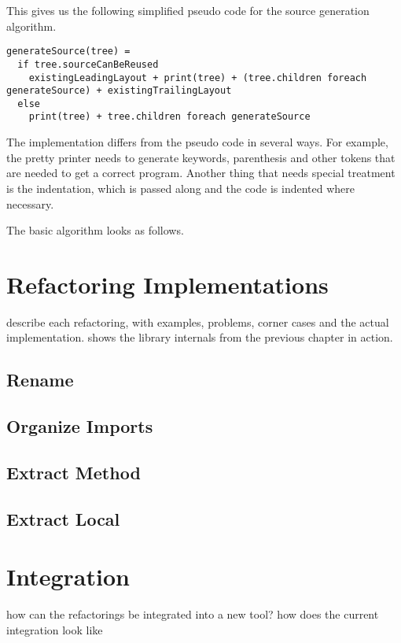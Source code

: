 \documentclass[10pt,a4paper,oneside]{scrreprt}
\begin{document}
This gives us the following simplified pseudo code for the source generation algorithm.

\begin{lstlisting}
generateSource(tree) = 
  if tree.sourceCanBeReused
    existingLeadingLayout + print(tree) + (tree.children foreach generateSource) + existingTrailingLayout
  else
    print(tree) + tree.children foreach generateSource
\end{lstlisting}

The implementation differs from the pseudo code in several ways. For example, the pretty printer needs to generate keywords, parenthesis and other tokens that are needed to get a correct program. Another thing that needs special treatment is the indentation, which is passed along and the code is indented where necessary.





 The basic algorithm looks as follows.





\chapter{Refactoring Implementations}

describe each refactoring, with examples, problems, corner cases and the actual implementation. shows the library internals from the previous chapter in action.

\section{Rename}
\section{Organize Imports}
\section{Extract Method}
\section{Extract Local}


\chapter{Integration}

how can the refactorings be integrated into a new tool?
how does the current integration look like
\end{document}
